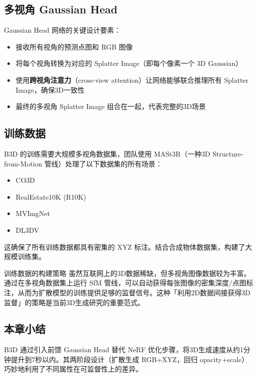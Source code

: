 \subsection{多视角 Gaussian Head}

Gaussian Head 网络的关键设计要素：

\begin{itemize}
    \item 接收所有视角的预测点图和 RGB 图像
    \item 将每个视角转换为对应的 Splatter Image（即每个像素一个 3D Gaussian）
    \item 使用\textbf{跨视角注意力}（cross-view attention）让网络能够联合推理所有 Splatter Image，确保3D一致性
    \item 最终的多视角 Splatter Image 组合在一起，代表完整的3D场景
\end{itemize}

\subsection{训练数据}

B3D 的训练需要大规模多视角数据集，团队使用 MASt3R（一种3D Structure-from-Motion 管线）处理了以下数据集的所有场景：

\begin{itemize}
    \item CO3D
    \item RealEstate10K (R10K)
    \item MVImgNet
    \item DL3DV
\end{itemize}

这确保了所有训练数据都具有密集的 XYZ 标注。结合合成物体数据集，构建了大规模训练集。

\begin{knowledgebox}{训练数据的构建策略}
虽然互联网上的3D数据稀缺，但多视角图像数据较为丰富。通过在多视角数据集上运行 SfM 管线，可以自动获得每张图像的密集深度/点图标注，从而为扩散模型的训练提供足够的监督信号。这种「利用2D数据间接获得3D监督」的策略是当前3D生成研究的重要范式。
\end{knowledgebox}

\subsection{本章小结}

B3D 通过引入前馈 Gaussian Head 替代 NeRF 优化步骤，将3D生成速度从约1分钟提升到7秒以内。其两阶段设计（扩散生成 RGB+XYZ，回归 opacity+scale）巧妙地利用了不同属性在可监督性上的差异。

